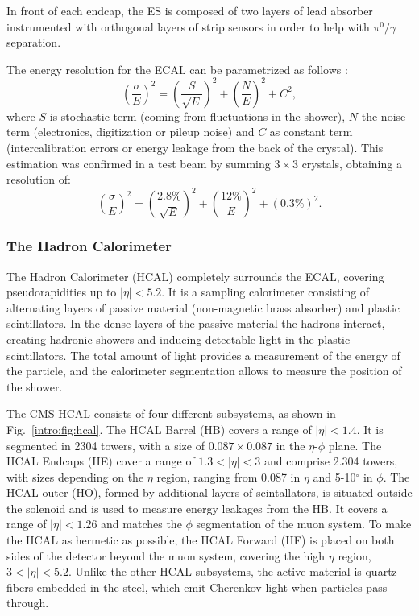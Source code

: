 \documentclass[../main.tex]{subfiles}
\begin{document}
In front of each endcap, the ES is composed of two layers of lead absorber instrumented with orthogonal layers of strip sensors in order to help with $\pi^0/\gamma$ separation.

The energy resolution for the ECAL can be parametrized as follows \cite{intro:exp:cms}:
\begin{equation}
\left(\frac{\sigma}{E}\right)^2 = \left(\frac{S}{\sqrt{E}}\right)^2 + \left(\frac{N}{E}\right)^2 + C^2,
\end{equation}
where $S$ is stochastic term (coming from fluctuations in the shower), $N$ the noise term (electronics, digitization or pileup noise) and $C$ as constant term (intercalibration errors or energy leakage from the back of the crystal). This estimation was confirmed in a test beam by summing $3\times3$ crystals, obtaining a resolution of:
\begin{equation}
\left(\frac{\sigma}{E}\right)^2 = \left(\frac{2.8\%}{\sqrt{E}}\right)^2 + \left(\frac{12\%}{E}\right)^2 + (0.3\%)^2.
\end{equation}

\subsubsection{The Hadron Calorimeter}

The Hadron Calorimeter (HCAL) \cite{intro:exp:hcal} completely surrounds the ECAL, covering pseudorapidities up to $|\eta|<5.2$. It is a sampling calorimeter consisting of alternating layers of passive material (non-magnetic brass absorber) and plastic scintillators. In the dense layers of the passive material the hadrons interact, creating hadronic showers and inducing detectable light in the plastic scintillators. The total amount of light provides a measurement of the energy of the particle, and the calorimeter segmentation allows to measure the position of the shower.

The CMS HCAL consists of four different subsystems, as shown in Fig.~\ref{intro:fig:hcal}. The HCAL Barrel (HB) covers a range of $|\eta|<1.4$. It is segmented in 2304 towers, with a size of $0.087\times0.087$ in the $\eta$-$\phi$ plane. The HCAL Endcaps (HE) cover a range of $1.3<|\eta|<3$ and comprise 2.304 towers, with sizes depending on the $\eta$ region, ranging from 0.087 in $\eta$ and 5-10${}^\circ$ in $\phi$. The HCAL outer (HO), formed by additional layers of scintallators, is situated outside the solenoid and is used to measure energy leakages from the HB. It covers a range of $|\eta|<1.26$ and matches the $\phi$ segmentation of the muon system. To make the HCAL as hermetic as possible, the HCAL Forward (HF) is placed on both sides of the detector beyond the muon system, covering the high $\eta$ region, $3 < |\eta| < 5.2$. Unlike the other HCAL subsystems, the active material is quartz fibers embedded in the steel, which emit Cherenkov light when particles pass through.
\end{document}
